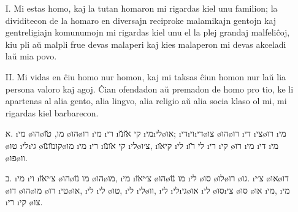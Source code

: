 \begin{LTR}
	\begin{enumerate}
		\item[I.] Mi estas homo, kaj la tutan homaron mi rigardas kiel unu familion; la dividitecon de la homaro en diversajn reciproke malamikajn gentojn kaj gentreligiajn komunumojn mi rigardas kiel unu el la plej grandaj malfeliĉoj, kiu pli aŭ malpli frue devas malaperi kaj kies malaperon mi devas akceladi laŭ mia povo.
		\item[II.] Mi vidas en ĉiu homo nur homon, kaj mi taksas ĉiun homon nur laŭ lia persona valoro kaj agoj. Ĉian ofendadon aŭ premadon de homo pro tio, ke li apartenas al alia gento, alia lingvo, alia religio aŭ alia socia klaso ol mi, mi rigardas kiel barbarecon.
	\end{enumerate}
\end{LTR}

\begin{enumerate}
	\item[א.] \i{מי}  \o{הו}\o{מו},   \u{טו} \o{הו}\o{רו} \i{מי} \i{רי} \i{קי} \u{או}\u{נו} \i{מי}\i{לי}\o{או};  \i{די}\i{וי}\i{די}\o{צו}   \o{הו}\o{רו}  \i{די} \i{צי}\o{רו} \i{מי} \o{טו}  \i{לי}\i{גי} \o{קו}\u{מו}\u{נו}\o{מו} \i{מי} \i{רי} \i{קי} \u{או}\u{נו}     \i{לי}\o{צ׳ו}, \i{קי}\u{או} \i{לי}  \i{לי} \u{רו}  \i{רי}  \i{קי} \o{רו} \i{מי}  \i{די}  \i{מי} \o{פו}\o{וו}.  
	\item[ב.] \i{מי} \i{וי}  \i{צ׳י}\u{או} \o{הו}\o{מו} \u{נו} \o{הו}\o{מו},  \i{מי}  \i{צ׳י}\u{או} \o{הו}\o{מו} \u{נו}  \i{לי} \o{סו} \o{לו}\o{רו}  \o{גו}. \i{צ׳י} \o{או}\o{דו}  \o{דו}  \o{הו}\o{מו} \o{רו} \i{טי}\o{או},  \i{לי}   \i{לי} \o{טו}, \i{לי} \i{לי}\o{וו}, \i{לי} \i{לי}\i{גי}\o{או}  \i{לי} \o{סו}\i{צי} \o{סו} \o{או} \i{מי}, \i{מי} \i{רי} \i{קי} \o{צו}.
\end{enumerate}

